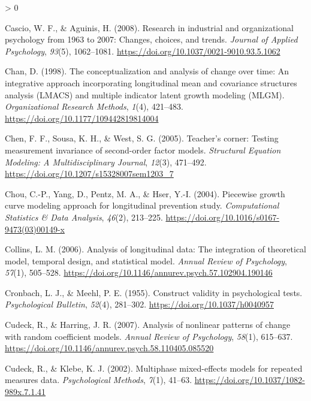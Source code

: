 \documentclass[
12pt, %
twoside,
english]{guelphthesis}
\newlength{\cslhangindent}
\newenvironment{CSLReferences}[2] %
 {%
  \setlength{\parindent}{0pt}
  \ifodd #1 \everypar{\setlength{\hangindent}{\cslhangindent}}\ignorespaces\fi
  \ifnum #2 > 0
  \setlength{\parskip}{\linespacing{2}}
  \fi
 }%
 {}
\begin{document}
\begin{CSLReferences}{1}{0}
\leavevmode{}%
Cascio, W. F., \& Aguinis, H. (2008). Research in industrial and organizational psychology from 1963 to 2007: Changes, choices, and trends. \emph{Journal of Applied Psychology}, \emph{93}(5), 1062--1081. \url{https://doi.org/10.1037/0021-9010.93.5.1062}

\leavevmode{}%
Chan, D. (1998). The conceptualization and analysis of change over time: An integrative approach incorporating longitudinal mean and covariance structures analysis (LMACS) and multiple indicator latent growth modeling (MLGM). \emph{Organizational Research Methods}, \emph{1}(4), 421--483. \url{https://doi.org/10.1177/109442819814004}

\leavevmode{}%
Chen, F. F., Sousa, K. H., \& West, S. G. (2005). Teacher's corner: Testing measurement invariance of second-order factor models. \emph{Structural Equation Modeling: A Multidisciplinary Journal}, \emph{12}(3), 471--492. \url{https://doi.org/10.1207/s15328007sem1203_7}

\leavevmode{}%
Chou, C.-P., Yang, D., Pentz, M. A., \& Hser, Y.-I. (2004). Piecewise growth curve modeling approach for longitudinal prevention study. \emph{Computational Statistics \& Data Analysis}, \emph{46}(2), 213--225. \url{https://doi.org/10.1016/s0167-9473(03)00149-x}

\leavevmode{}%
Collins, L. M. (2006). Analysis of longitudinal data: The integration of theoretical model, temporal design, and statistical model. \emph{Annual Review of Psychology}, \emph{57}(1), 505--528. \url{https://doi.org/10.1146/annurev.psych.57.102904.190146}

\leavevmode{}%
Cronbach, L. J., \& Meehl, P. E. (1955). Construct validity in psychological tests. \emph{Psychological Bulletin}, \emph{52}(4), 281--302. \url{https://doi.org/10.1037/h0040957}

\leavevmode{}%
Cudeck, R., \& Harring, J. R. (2007). Analysis of nonlinear patterns of change with random coefficient models. \emph{Annual Review of Psychology}, \emph{58}(1), 615--637. \url{https://doi.org/10.1146/annurev.psych.58.110405.085520}

\leavevmode{}%
Cudeck, R., \& Klebe, K. J. (2002). Multiphase mixed-effects models for repeated measures data. \emph{Psychological Methods}, \emph{7}(1), 41--63. \url{https://doi.org/10.1037/1082-989x.7.1.41}


\end{CSLReferences}
\end{document}
